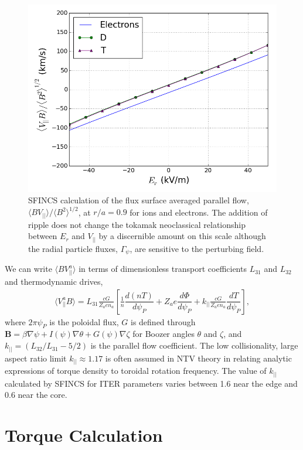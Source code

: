 \documentclass[aip, pop, preprint]{revtex4-1}
\numberwithin{figure}{section}
\numberwithin{equation}{section}
\newcommand{\der}[2]{\dfrac{d #1}{d  #2}}
\begin{document}
\begin{figure}[h!]
\centering
\includegraphics[width=.7\textwidth]{Er_flow.png}
\caption{\label{fig:Er_flow} SFINCS calculation of the flux surface averaged parallel flow, $\langle B V_{||} \rangle/\langle B^2 \rangle^{1/2}$, at $r/a = 0.9$ for ions and electrons. The addition of ripple does not change the tokamak neoclassical relationship between $E_r$ and $V_{||}$ by a discernible amount on this scale although the radial particle fluxes, $\Gamma_{\psi}$, are sensitive to the perturbing field.}
\end{figure}

We can write $\langle B V_{||}^a \rangle$ in terms of dimensionless transport coefficients $L_{31}$ and $L_{32}$ and thermodynamic drives,
\begin{gather}
\langle  V_{||}^a  B\rangle = L_{31} \frac{c G}{Z_a e n_a} \left[ \frac{1}{n} \der{(nT)}{\psi_P} + Z_a e \der{\Phi}{\psi_P}  + k_{||} \frac{cG}{Z_a e n_a} \der{T}{\psi_P} \right],
\end{gather}
where $2 \pi \psi_P$ is the poloidal flux,  $G$ is defined through $\bm{B} = \beta \nabla \psi + I(\psi) \nabla \theta + G(\psi) \nabla \zeta$ for Boozer angles $\theta$ and $\zeta$, and $k_{||} = (L_{32}/L_{31} - 5/2)$ is the parallel flow coefficient. The low collisionality, large aspect ratio limit\cite{Hinton1976, Hirshman1981} $k_{||} \approx 1.17$ is often assumed in NTV theory\cite{Callen2011, Sun2011} in relating analytic expressions of torque density to toroidal rotation frequency. The value of $k_{||}$ calculated by SFINCS for ITER parameters varies between 1.6 near the edge and 0.6 near the core. 

\FloatBarrier

\section{Torque Calculation}\label{torque}
\end{document}
